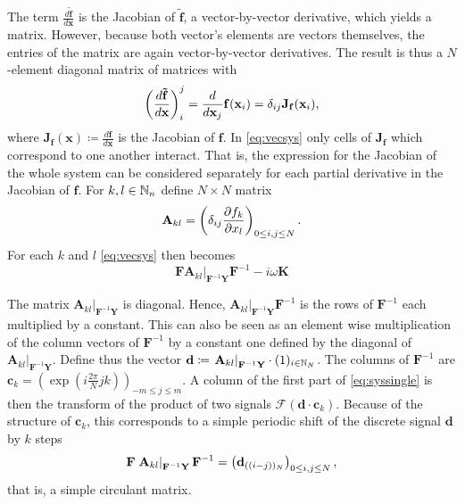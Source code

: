 
The term $\frac{d\mathbf{\tilde f}}{d\mathbf x}$ is the Jacobian of $\mathbf{\tilde f}$, a vector-by-vector derivative, which yields a matrix.
However, because both vector's elements are vectors themselves, the entries of the matrix are again vector-by-vector derivatives.
The result is thus a $N$-element diagonal matrix of matrices with
	\[
			\left(\frac{d\mathbf{\tilde f}}{d\mathbf x}\right)_i^j = \frac{d}{d\mathbf x_j} \mathbf f (\mathbf x_i) = \delta_{ij} \mathbf J_{\mathbf f}(\mathbf x_i) \text, %
	\]
where $\mathbf J_{\mathbf f} (\mathbf x) \coloneqq \frac{d \mathbf f}{d\mathbf x}$ is the Jacobian of $\mathbf f$.
In \autoref{eq:vecsys} only cells of $\mathbf J_{\mathbf f}$ which correspond to one another interact.
That is, the expression for the Jacobian of the whole system can be considered separately for each partial derivative in the Jacobian of $\mathbf f$.
For $k,l \in \mathbb{N}_n$ define $N \times N$ matrix 
	\[
		\mathbf A_{kl} = \left( \delta_{ij} \frac{\partial f_k}{\partial x_l} \right)_{0 \le i,j \le N} \text.
	\]
For each $k$ and $l$ \autoref{eq:vecsys} then becomes
	\begin{equation}
		\mathbf{F} \left.\mathbf A_{kl}\right|_{\mathbf{F}^{-1} \mathbf{Y}} \mathbf{F}^{-1} - i \omega \mathbf K
	\label{eq:syssingle}
	\end{equation}

The matrix $\left. \mathbf A_{kl}\right|_{\mathbf{F}^{-1} \mathbf{Y}}$ is diagonal.
Hence, $\left. \mathbf A_{kl}\right|_{\mathbf{F}^{-1} \mathbf{Y}} \mathbf{F}^{-1}$ is the rows of $\mathbf F^{-1}$ each multiplied by a constant.
This can also be seen as an element wise multiplication of the column vectors of $\mathbf F^{-1}$ by a constant one defined by the diagonal of $\left. \mathbf A_{kl}\right|_{\mathbf{F}^{-1} \mathbf{Y}}$.
Define thus the vector $\mathbf d \coloneqq \left. \mathbf A_{kl}\right|_{\mathbf{F}^{-1} \mathbf{Y}} \cdot (1)_{i \in \mathbb{N}_N}$.
The columns of $\mathbf F^{-1}$ are $\mathbf c_k = \left(\exp\left(i\frac{2\pi}{N} j k\right)\right)_{-m \le j \le m}$.
A column of the first part of \autoref{eq:syssingle} is then the transform of the product of two signals $\mathcal F(\mathbf d \cdot \mathbf c_k)$.
Because of the structure of $\mathbf c_k$, this corresponds to a simple periodic shift of the discrete signal $\mathbf d$ by $k$ steps
	\[
			\mathbf{F} \left.\mathbf A_{kl}\right|_{\mathbf{F}^{-1} \mathbf{Y}} \mathbf{F}^{-1} = \left( \mathbf d_{((i-j))_N} \right)_{0 \le i,j \le N} \text,
	\]
that is, a simple circulant matrix.

